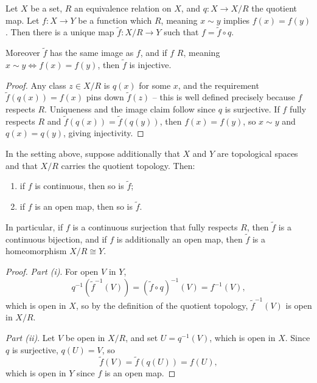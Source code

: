 \begin{proposition}
    Let $X$ be a set, $R$ an equivalence relation on $X$, and $q: X \rightarrow X/R$ the quotient map. Let $f: X \rightarrow Y$ be a function which  $R$, meaning $x \sim y$ implies $f(x) = f(y)$. Then there is a unique map $\tilde{f}: X/R \rightarrow Y$ such that $f = \tilde{f} \circ q$.

    Moreover $\tilde{f}$ has the same image as $f$, and if $f$  $R$, meaning $x \sim y \iff f(x) = f(y)$, then $\tilde{f}$ is injective.
\end{proposition}
\begin{proof}
    Any class $z \in X/R$ is $q(x)$ for some $x$, and the requirement $\tilde{f}(q(x)) = f(x)$ pins down $\tilde{f}(z)$ -- this is well defined precisely because $f$ respects $R$. Uniqueness and the image claim follow since $q$ is surjective. If $f$ fully respects $R$ and $\tilde{f}(q(x)) = \tilde{f}(q(y))$, then $f(x) = f(y)$, so $x \sim y$ and $q(x) = q(y)$, giving injectivity.
\end{proof}

\begin{proposition}
    In the setting above, suppose additionally that $X$ and $Y$ are topological spaces and that $X/R$ carries the quotient topology. Then:
    \begin{enumerate}[label=(\roman*)]
        \item if $f$ is continuous, then so is $\tilde{f}$;
        \item if $f$ is an open map, then so is $\tilde{f}$.
    \end{enumerate}
    In particular, if $f$ is a continuous surjection that fully respects $R$, then $\tilde{f}$ is a continuous bijection, and if $f$ is additionally an open map, then $\tilde{f}$ is a homeomorphism $X/R \cong Y$.
\end{proposition}
\begin{proof}
    \emph{Part (i)}. For open $V$ in $Y$,
    $$
    q^{-1}(\tilde{f}^{-1}(V)) = (\tilde{f} \circ q)^{-1}(V) = f^{-1}(V),
    $$
    which is open in $X$, so by the definition of the quotient topology, $\tilde{f}^{-1}(V)$ is open in $X/R$.

    \emph{Part (ii)}. Let $V$ be open in $X/R$, and set $U = q^{-1}(V)$, which is open in $X$. Since $q$ is surjective, $q(U) = V$, so
    $$
    \tilde{f}(V) = \tilde{f}(q(U)) = f(U),
    $$
    which is open in $Y$ since $f$ is an open map.
\end{proof}

